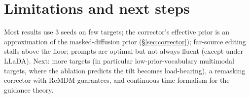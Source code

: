 \documentclass[11pt]{article}
\begin{document}
\section{Limitations and next steps}
Most results use 3 seeds on few targets; the corrector's effective prior
is an approximation of the masked-diffusion prior
(\S\ref{sec:corrector}); far-source editing stalls above the floor;
prompts are optimal but not always fluent (except under LLaDA).
Next: more targets (in particular low-prior-vocabulary multimodal targets,
where the ablation predicts the tilt becomes load-bearing), a remasking
corrector with ReMDM guarantees, and continuous-time formalism for the
guidance theory.
\end{document}
